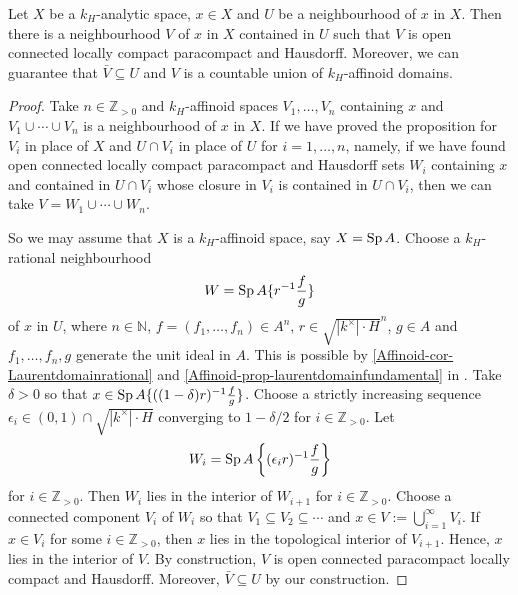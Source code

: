 \begin{proposition}\label{prop-kanalyticspacelocal}
    Let $X$ be a $k_H$-analytic space, $x\in X$ and $U$ be a neighbourhood of $x$ in $X$. Then there is a neighbourhood $V$ of $x$ in $X$ contained in $U$ such that $V$ is open connected locally compact paracompact and Hausdorff. Moreover, we can guarantee that $\bar{V}\subseteq U$ and $V$ is a countable union of $k_H$-affinoid domains.
\end{proposition}
\begin{proof}
    Take $n\in \mathbb{Z}_{>0}$ and $k_H$-affinoid spaces $V_1,\ldots,V_n$ containing $x$ and $V_1\cup\cdots\cup V_n$ is a neighbourhood of $x$ in $X$. If we have proved the proposition for $V_i$ in place of $X$ and $U\cap V_i$ in place of $U$ for $i=1,\ldots,n$, namely, if we have found open connected locally compact paracompact and Hausdorff sets $W_i$ containing $x$ and contained in $U\cap V_i$ whose closure in $V_i$ is contained in $U\cap V_i$,
    then we can take $V=W_1\cup\cdots\cup W_n$.

    So we may assume that $X$ is a $k_H$-affinoid space, say $X=\operatorname{Sp} A$. Choose a $k_H$-rational neighbourhood 
    \[
        W=\operatorname{Sp} A\{r^{-1}\frac{f}{g}\}  
    \]
    of $x$ in $U$, where $n\in \mathbb{N}$,  $f=(f_1,\ldots,f_n)\in A^n$, $r\in \sqrt{|k^{\times}|\cdot H}^n$, $g\in A$ and $f_1,\ldots,f_n,g$ generate the unit ideal in $A$. This is possible by \cref{Affinoid-cor-Laurentdomainrational} and \cref{Affinoid-prop-laurentdomainfundamental} in . 
    Take $\delta>0$ so that $x\in \operatorname{Sp} A\{((1-\delta)r)^{-1}\frac{f}{g}\}$.
    Choose a strictly increasing sequence $\epsilon_i\in (0,1)\cap \sqrt{|k^{\times}|\cdot H}$ converging to $1-\delta/2$ for $i\in \mathbb{Z}_{>0}$. Let 
    \[
        W_i=\operatorname{Sp} A\left\{ (\epsilon_i r)^{-1}\frac{f}{g} \right\}  
    \]
    for $i\in \mathbb{Z}_{>0}$.
    Then $W_i$ lies in the interior of $W_{i+1}$ for $i\in \mathbb{Z}_{>0}$. Choose a connected component $V_i$ of $W_i$ so that $V_1\subseteq V_2\subseteq \cdots$ and $x\in V:=\bigcup_{i=1}^{\infty} V_i$. If $x\in V_i$ for some $i\in \mathbb{Z}_{>0}$, then $x$ lies in the topological interior of $V_{i+1}$. Hence, $x$ lies in the interior of $V$. By construction, $V$ is open connected paracompact locally compact and Hausdorff. Moreover, $\bar{V}\subseteq U$ by our construction.
\end{proof}

